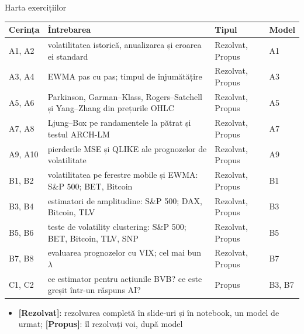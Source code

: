 \begin{frame}{Harta exercițiilor}
\itemsize{\small}
\begin{center}
\scriptsize
\begin{tabular}{>{\raggedright\arraybackslash}p{1.1cm}>{\raggedright\arraybackslash}p{7.5cm}>{\raggedright\arraybackslash}p{1.9cm}>{\raggedright\arraybackslash}p{1.4cm}}
\toprule
\textbf{Cerința} & \textbf{Întrebarea} & \textbf{Tipul} & \textbf{Model} \\
\midrule
A1, A2 & volatilitatea istorică, anualizarea și eroarea ei standard & Rezolvat, Propus & A1 \\
A3, A4 & EWMA pas cu pas; timpul de înjumătățire & Rezolvat, Propus & A3 \\
A5, A6 & Parkinson, Garman--Klass, Rogers--Satchell și Yang--Zhang din prețurile OHLC & Rezolvat, Propus & A5 \\
A7, A8 & Ljung--Box pe randamentele la pătrat și testul ARCH-LM & Rezolvat, Propus & A7 \\
A9, A10 & pierderile MSE și QLIKE ale prognozelor de volatilitate & Rezolvat, Propus & A9 \\
B1, B2 & volatilitatea pe ferestre mobile și EWMA: S\&P 500; BET, Bitcoin & Rezolvat, Propus & B1 \\
B3, B4 & estimatori de amplitudine: S\&P 500; DAX, Bitcoin, TLV & Rezolvat, Propus & B3 \\
B5, B6 & teste de volatility clustering: S\&P 500; BET, Bitcoin, TLV, SNP & Rezolvat, Propus & B5 \\
B7, B8 & evaluarea prognozelor cu VIX; cel mai bun $\lambda$ & Rezolvat, Propus & B7 \\
C1, C2 & ce estimator pentru acțiunile BVB? ce este greșit într-un răspuns AI? & Propus & B3, B7 \\
\bottomrule
\end{tabular}
\end{center}
\begin{itemize}
    \item \textbf{[Rezolvat]}: rezolvarea completă în slide-uri și în notebook, un model de urmat; \textbf{[Propus]}: îl rezolvați voi, după model
\end{itemize}
\end{frame}

